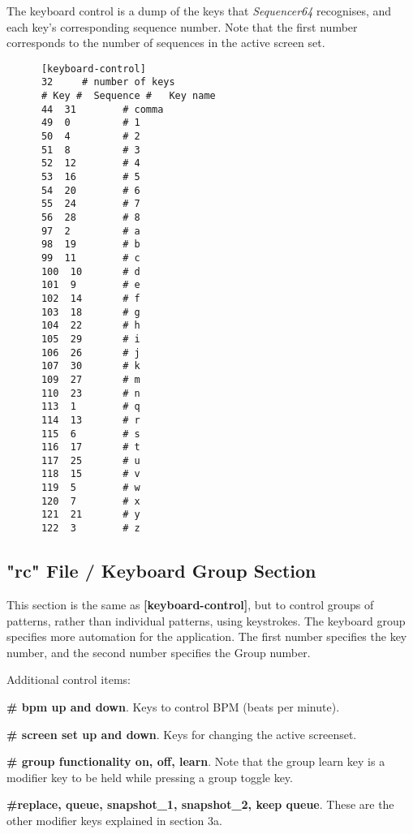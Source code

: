   The keyboard control is a dump of the keys that \textsl{Sequencer64}
   recognises, and each key's corresponding sequence number.
   Note that the first number corresponds to the number of sequences in
   the active screen set.

   \begin{verbatim}
      [keyboard-control]
      32     # number of keys
      # Key #  Sequence #   Key name
      44  31        # comma
      49  0         # 1
      50  4         # 2
      51  8         # 3
      52  12        # 4
      53  16        # 5
      54  20        # 6
      55  24        # 7
      56  28        # 8
      97  2         # a
      98  19        # b
      99  11        # c
      100  10       # d
      101  9        # e
      102  14       # f
      103  18       # g
      104  22       # h
      105  29       # i
      106  26       # j
      107  30       # k
      109  27       # m
      110  23       # n
      113  1        # q
      114  13       # r
      115  6        # s
      116  17       # t
      117  25       # u
      118  15       # v
      119  5        # w
      120  7        # x
      121  21       # y
      122  3        # z
   \end{verbatim}

\subsection{"rc" File / Keyboard Group Section}
\label{subsec:seq64_rc_file_keyboard_group}

   This section is the same as
   \textbf{[keyboard-control]}, but to control groups of patterns, rather than
   individual patterns, using keystrokes.
   The keyboard group specifies more automation for the application.  The
   first number specifies the key number, and the second number specifies
   the Group number.

   Additional control items:

   \begin{enumber}
      \item \textbf{\# bpm up and down}.
         Keys to control BPM (beats per minute).
      \item \textbf{\# screen set up and down}.
         Keys for changing the active screenset.
      \item \textbf{\# group functionality on, off, learn}.
         Note that the group learn key is a modifier key to be held while 
         pressing a group toggle key.
      \item \textbf{\#replace, queue, snapshot\_1, snapshot\_2, keep queue}.
         These are the other modifier keys explained in section 3a.
   \end{enumber}

